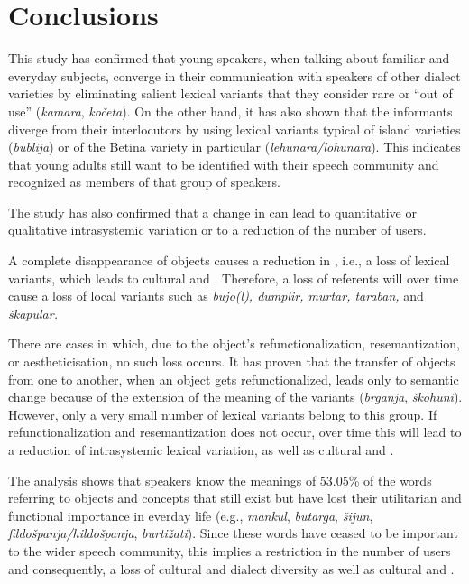 \documentclass[output=paper]{LSP/langsci}
\begin{document}
\section{Conclusions}
This study has confirmed that young speakers, when talking about familiar and everyday subjects, converge in their communication with speakers of other dialect varieties by eliminating salient lexical variants that they consider rare or “out of use” (\textit{kamara}, \textit{kočeta}). On the other hand, it has also shown that the informants diverge from their interlocutors by using lexical variants typical of island varieties (\textit{bublija}) or of the Betina variety in particular (\textit{lehunara/lohunara}). This indicates that young adults still want to be identified with their speech community and recognized as members of that group of speakers. 

The study has also confirmed that a change in  can lead to quantitative or qualitative intrasystemic variation or to a reduction of the number of users. 

A complete disappearance of objects causes a reduction in , i.e., a loss of lexical variants, which leads to cultural and . Therefore, a loss of referents will over time cause a loss of local variants such as \textit{bujo(l), dumplir, murtar, taraban, }and \textit{škapular. }

There are cases in which, due to the object’s refunctionalization, resemantization, or aestheticisation, no such loss occurs. It has proven that the transfer of objects from one  to another, when an object gets refunctionalized, leads only to semantic change because of the extension of the meaning of the variants (\textit{brganja}, \textit{škohuni}). However, only a very small number of lexical variants belong to this group. If refunctionalization and resemantization does not occur, over time this will lead to a reduction of intrasystemic lexical variation, as well as cultural and . 

The analysis shows that speakers know the meanings of 53.05\% of the words referring to objects and concepts that still exist but have lost their utilitarian and functional importance in everday life (e.g., \textit{mankul}, \textit{butarga}, \textit{šijun}, \textit{fildošpanja/hildošpanja}, \textit{burtižati}). Since these words have ceased to be important to the wider speech community, this implies a restriction in the number of users and consequently, a loss of cultural and dialect diversity as well as cultural and .
\end{document}
